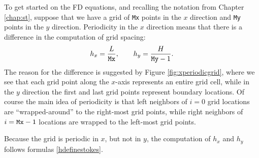 To get started on the FD equations, and recalling the notation from Chapter \ref{chap:st}, suppose that we have a grid of \texttt{Mx} points in the $x$ direction and \texttt{My} points in the $y$ direction.  Periodicity in the $x$ direction means that there is a difference in the computation of grid spacing:
\begin{equation}
h_x = \frac{L}{\text{\texttt{Mx}}}, \qquad h_y = \frac{H}{\text{\texttt{My}}-1}. \label{hdefinestokes}
\end{equation}
The reason for the difference is suggested by Figure \ref{fig:xperiodicgrid}, where we see that each grid point along the $x$-axis represents an entire grid cell, while in the $y$ direction the first and last grid points represent boundary locations.  Of course the main idea of periodicity is that left neighbors of $i=0$ grid locations are ``wrapped-around'' to the right-most grid points, while right neighbors of $i=\text{\texttt{Mx}}-1$ locations are wrapped to the left-most grid points.

\begin{marginfigure}
\caption{Because the grid is periodic in $x$, but not in $y$, the computation of $h_x$ and $h_y$ follows formulas \eqref{hdefinestokes}.}
\label{fig:xperiodicgrid}
\end{marginfigure}

